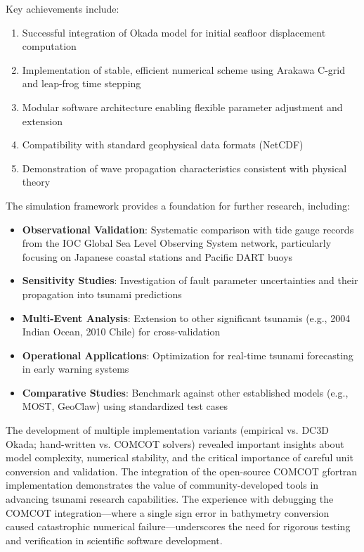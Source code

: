 \documentclass[12pt]{article}
\begin{document}
Key achievements include:
\begin{enumerate}
    \item Successful integration of Okada model for initial seafloor displacement computation
    \item Implementation of stable, efficient numerical scheme using Arakawa C-grid and leap-frog time stepping
    \item Modular software architecture enabling flexible parameter adjustment and extension
    \item Compatibility with standard geophysical data formats (NetCDF)
    \item Demonstration of wave propagation characteristics consistent with physical theory
\end{enumerate}

The simulation framework provides a foundation for further research, including:
\begin{itemize}
    \item \textbf{Observational Validation}: Systematic comparison with tide gauge records from the IOC Global Sea Level Observing System network, particularly focusing on Japanese coastal stations and Pacific DART buoys
    \item \textbf{Sensitivity Studies}: Investigation of fault parameter uncertainties and their propagation into tsunami predictions
    \item \textbf{Multi-Event Analysis}: Extension to other significant tsunamis (e.g., 2004 Indian Ocean, 2010 Chile) for cross-validation
    \item \textbf{Operational Applications}: Optimization for real-time tsunami forecasting in early warning systems
    \item \textbf{Comparative Studies}: Benchmark against other established models (e.g., MOST, GeoClaw) using standardized test cases
\end{itemize}

The development of multiple implementation variants (empirical vs. DC3D Okada; hand-written vs. COMCOT solvers) revealed important insights about model complexity, numerical stability, and the critical importance of careful unit conversion and validation. The integration of the open-source COMCOT gfortran implementation \cite{comcot_gfortran} demonstrates the value of community-developed tools in advancing tsunami research capabilities. The experience with debugging the COMCOT integration—where a single sign error in bathymetry conversion caused catastrophic numerical failure—underscores the need for rigorous testing and verification in scientific software development.
\end{document}
